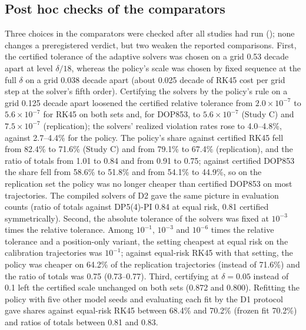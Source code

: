 \documentclass[10pt,letterpaper]{article}
\begin{document}
\subsection*{Post hoc checks of the comparators}
Three choices in the comparators were checked after all studies had run (); none changes a preregistered verdict, but two weaken the reported comparisons. First, the certified tolerance of the adaptive solvers was chosen on a grid 0.53 decade apart at level $\delta/18$, whereas the policy's scale was chosen by fixed sequence at the full $\delta$ on a grid 0.038 decade apart (about 0.025 decade of RK45 cost per grid step at the solver's fifth order). Certifying the solvers by the policy's rule on a grid 0.125 decade apart loosened the certified relative tolerance from $2.0\times10^{-7}$ to $5.6\times10^{-7}$ for RK45 on both sets and, for DOP853, to $5.6\times10^{-7}$ (Study C) and $7.5\times10^{-7}$ (replication); the solvers' realized violation rates rose to 4.0--4.8\%, against 2.7--4.4\% for the policy. The policy's share against certified RK45 fell from 82.4\% to 71.6\% (Study C) and from 79.1\% to 67.4\% (replication), and the ratio of totals from 1.01 to 0.84 and from 0.91 to 0.75; against certified DOP853 the share fell from 58.6\% to 51.8\% and from 54.1\% to 44.9\%, so on the replication set the policy was no longer cheaper than certified DOP853 on most trajectories. The compiled solvers of D2 gave the same picture in evaluation counts (ratio of totals against DP5(4)-PI 0.84 at equal risk, 0.81 certified symmetrically). Second, the absolute tolerance of the solvers was fixed at $10^{-3}$ times the relative tolerance. Among $10^{-1}$, $10^{-3}$ and $10^{-6}$ times the relative tolerance and a position-only variant, the setting cheapest at equal risk on the calibration trajectories was $10^{-1}$; against equal-risk RK45 with that setting, the policy was cheaper on 64.2\% of the replication trajectories (instead of 71.6\%) and the ratio of totals was 0.75 (0.73--0.77). Third, certifying at $\delta = 0.05$ instead of 0.1 left the certified scale unchanged on both sets (0.872 and 0.800). Refitting the policy with five other model seeds and evaluating each fit by the D1 protocol gave shares against equal-risk RK45 between 68.4\% and 70.2\% (frozen fit 70.2\%) and ratios of totals between 0.81 and 0.83.
\end{document}
